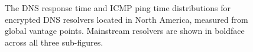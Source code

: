 \begin{figure}[t!]
\begin{minipage}{1.35\textwidth}
\hfill%
%
\hfill%
%
\hfill%
%
    \caption{The DNS response time and ICMP ping time distributions for
    encrypted DNS resolvers located in North America, measured from global vantage points.
    Mainstream resolvers are shown in boldface across all three
    sub-figures.}
\label{fig:dns-NA}
\end{minipage}
\end{figure}
\fi

